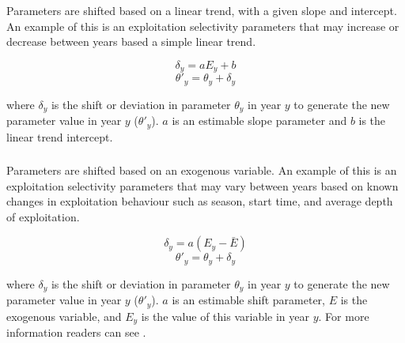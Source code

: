 \subsubsection[Linear]{}\label{sec:TimeVarying-Linear}

Parameters are shifted based on a linear trend, with a given slope and intercept. An example of this is an exploitation selectivity parameters that may increase or decrease between years based a simple linear trend.

\begin{equation}
	\delta_y = a E_y + b
\end{equation}
\begin{equation}
	\theta'_y = \theta_y + \delta_y
\end{equation}

where $\delta_y$ is the shift or deviation in parameter $\theta_y$ in year $y$ to generate the new parameter value in year $y$ ($\theta'_y$). $a$ is an estimable slope parameter and $b$ is the linear trend intercept.

\subsubsection[Exogenous]{}\label{sec:TimeVarying-Exogenous}

Parameters are shifted based on an exogenous variable. An example of this is an exploitation selectivity parameters that may vary between years based on known changes in exploitation behaviour such as season, start time, and average depth of exploitation.

\begin{equation}
	\delta_y = a(E_y - \bar{E})
\end{equation}
\begin{equation}
	\theta'_y = \theta_y + \delta_y
\end{equation}

where $\delta_y$ is the shift or deviation in parameter $\theta_y$ in year $y$ to generate the new parameter value in year $y$ ($\theta'_y$). $a$ is an estimable shift parameter, $E$ is the exogenous variable, and $E_y$ is the value of this variable in year $y$. For more information readers can see \cite{francis_03}.

\subsubsection[Annual shift]{} \label{sec:TimeVarying-AnnualShift}

